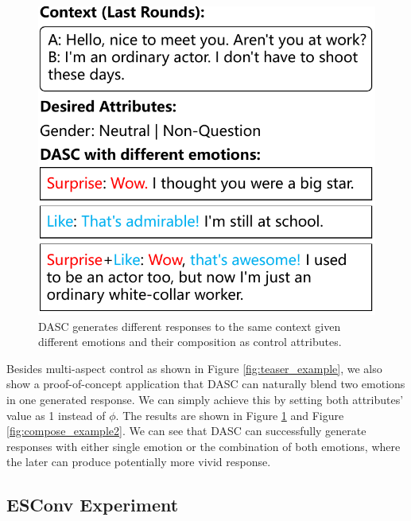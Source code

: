 \begin{figure}[h]
    \centering
    \includegraphics[width=0.75\columnwidth]{figures/compose_example1_en.pdf}
    \caption{DASC generates different responses to the same context given different emotions and their composition as control attributes.}
    \label{fig:compose_example1_en}
\end{figure}

Besides multi-aspect control as shown in Figure \ref{fig:teaser_example}, 
we also show a proof-of-concept application that DASC can naturally blend two emotions in one generated response. We can simply achieve this by setting both attributes' value as 1 instead of $\phi$. The results are shown in Figure \ref{fig:compose_example1_en} and Figure \ref{fig:compose_example2}. We can see that DASC can successfully generate responses with either single emotion or the combination of both emotions, where the later can produce potentially more vivid response.

\subsection{ESConv Experiment}

